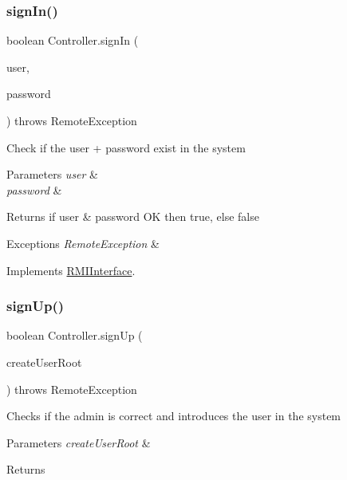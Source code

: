 \subsubsection{\texorpdfstring{sign\+In()}{signIn()}}
{\footnotesize\ttfamily boolean Controller.\+sign\+In (\begin{DoxyParamCaption}\item[{String}]{user,  }\item[{String}]{password }\end{DoxyParamCaption}) throws Remote\+Exception}

Check if the user + password exist in the system 
\begin{DoxyParams}{Parameters}
{\em user} & \\
\hline
{\em password} & \\
\hline
\end{DoxyParams}
\begin{DoxyReturn}{Returns}
if user \& password OK then true, else false
\begin{DoxyItemize}
\item 
\end{DoxyItemize}
\end{DoxyReturn}

\begin{DoxyExceptions}{Exceptions}
{\em Remote\+Exception} & \\
\hline
\end{DoxyExceptions}


Implements \hyperlink{interface_r_m_i_interface_a826db0ba8f0814985cfa911ef76a68cc}{R\+M\+I\+Interface}.

\mbox{\label{class_controller_aa4680640bce9264c99dd4cc928d31384}} 
\subsubsection{\texorpdfstring{sign\+Up()}{signUp()}}
{\footnotesize\ttfamily boolean Controller.\+sign\+Up (\begin{DoxyParamCaption}\item[{\hyperlink{class_create_user_root}{Create\+User\+Root}}]{create\+User\+Root }\end{DoxyParamCaption}) throws Remote\+Exception}

Checks if the admin is correct and introduces the user in the system 
\begin{DoxyParams}{Parameters}
{\em create\+User\+Root} & \\
\hline
\end{DoxyParams}
\begin{DoxyReturn}{Returns}

\end{DoxyReturn}

